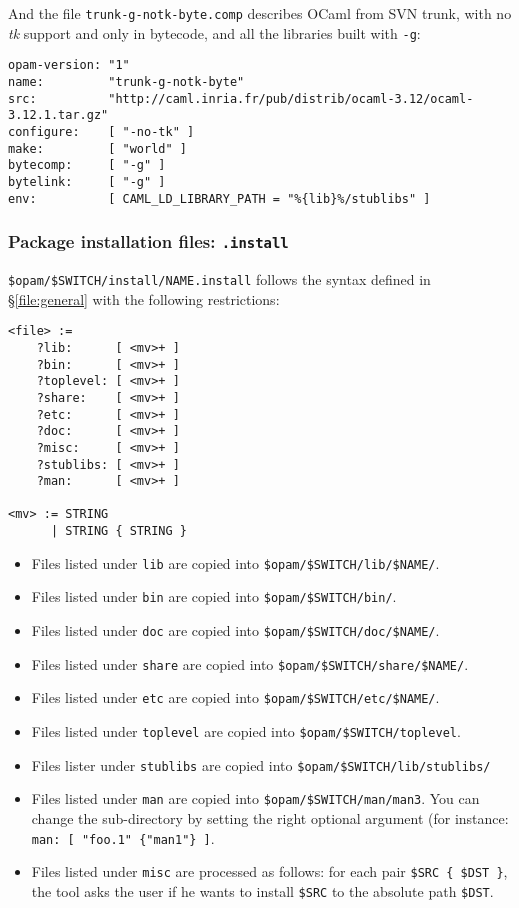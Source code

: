 \documentclass[a4paper,10pt]{article}
\begin{document}
And the file {\tt trunk-g-notk-byte.comp} describes OCaml from SVN
trunk, with no {\em tk} support and only in bytecode, and all the
libraries built with {\tt -g}:

\begin{verbatim}
opam-version: "1"
name:         "trunk-g-notk-byte"
src:          "http://caml.inria.fr/pub/distrib/ocaml-3.12/ocaml-3.12.1.tar.gz"
configure:    [ "-no-tk" ]
make:         [ "world" ]
bytecomp:     [ "-g" ]
bytelink:     [ "-g" ]
env:          [ CAML_LD_LIBRARY_PATH = "%{lib}%/stublibs" ]
\end{verbatim}


\subsubsection{Package installation files: {\tt *.install}}
\label{file:install}

\verb+$opam/$SWITCH/install/NAME.install+ follows the syntax defined
in \S\ref{file:general} with the following restrictions:

{\small
\begin{Verbatim}[frame=single]
<file> :=
    ?lib:      [ <mv>+ ]
    ?bin:      [ <mv>+ ]
    ?toplevel: [ <mv>+ ]
    ?share:    [ <mv>+ ]
    ?etc:      [ <mv>+ ]
    ?doc:      [ <mv>+ ]
    ?misc:     [ <mv>+ ]
    ?stublibs: [ <mv>+ ]
    ?man:      [ <mv>+ ]

<mv> := STRING
      | STRING { STRING }
\end{Verbatim}
}

\begin{itemize}
\item Files listed under {\tt lib} are copied into \verb+$opam/$SWITCH/lib/$NAME/+.
\item Files listed under {\tt bin} are copied into \verb+$opam/$SWITCH/bin/+.
\item Files listed under {\tt doc} are copied into \verb+$opam/$SWITCH/doc/$NAME/+.
\item Files listed under {\tt share} are copied into \verb+$opam/$SWITCH/share/$NAME/+.
\item Files listed under {\tt etc} are copied into \verb+$opam/$SWITCH/etc/$NAME/+.
\item Files listed under {\tt toplevel} are copied into \verb+$opam/$SWITCH/toplevel+.
\item Files lister under {\tt stublibs} are copied into \verb+$opam/$SWITCH/lib/stublibs/+
\item Files listed under {\tt man} are copied into
  \verb+$opam/$SWITCH/man/man3+. You can change the sub-directory by setting
  the right optional argument (for instance:
  \verb+man: [ "foo.1" {"man1"} ]+.
\item Files listed under {\tt misc} are processed as follows:
  for each pair \verb+$SRC { $DST }+, the tool asks the user if
  he wants to install \verb+$SRC+ to the absolute path \verb+$DST+.
\end{itemize}
\end{document}

